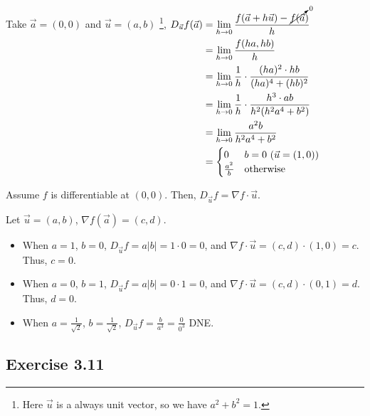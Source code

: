 \documentclass[11pt,fleqn]{book} %
\begin{document}
Take $\vec{a} = (0,0)$ and $\vec{u} = (a,b)$ \footnote{Here $\vec{u}$ is a always unit vector, so we have $a^2 + b^2 = 1$. },
$\begin{aligned}[t]
    D_{\vec{u}} f(\vec{a}) & = \lim_{h\to0} \frac{f(\vec{a} + h\vec{u}) - \cancelto{0}{f(\vec{a}})}{h} \\
                           & = \lim_{h\to0} \frac{f(ha, hb)}{h}                                        \\
                           & = \lim_{h\to0} \frac{1}{h} \cdot \frac{(ha)^2 \cdot hb}{(ha)^4 + (hb)^2}  \\
                           & = \lim_{h\to0} \frac{1}{h} \cdot \frac{h^3 \cdot ab}{h^2(h^2a^4 + b^2)}   \\
                           & = \lim_{h\to0} \frac{a^2b}{h^2a^4 + b^2}                                  \\
                           & = \begin{cases}
                                   0             & b = 0 ~ (\vec{u} = (1,0)) \\
                                   \frac{a^2}{b} & \text{otherwise}
                               \end{cases}
\end{aligned}$

Assume $f$ is differentiable at $(0,0)$. Then, $D_{\vec{u}}f = \nabla f \cdot \vec{u}$. 

Let $\vec{u} = (a,b)$, $\nabla f(\vec{a}) = (c,d)$. 
\begin{itemize}
    \item When $a = 1$, $b = 0$,  $D_{\vec{u}} f = a|b| = 1 \cdot 0 = 0$, and $\nabla f \cdot \vec{u} = (c, d) \cdot (1, 0) = c$. Thus, $c = 0$. 
    \item When $a = 0$, $b = 1$,  $D_{\vec{u}} f = a|b| = 0 \cdot 1 = 0$, and $\nabla f \cdot \vec{u} = (c, d) \cdot (0, 1) = d$. Thus, $d = 0$. 
    \item When $a = \frac{1}{\sqrt{2}}$, $b = \frac{1}{\sqrt{2}}$, $D_{\vec{u}} f = \frac{b}{a^3} = \frac{0}{0^3}$ DNE. %
\end{itemize}

\subsection*{Exercise 3.11}
\end{document}
